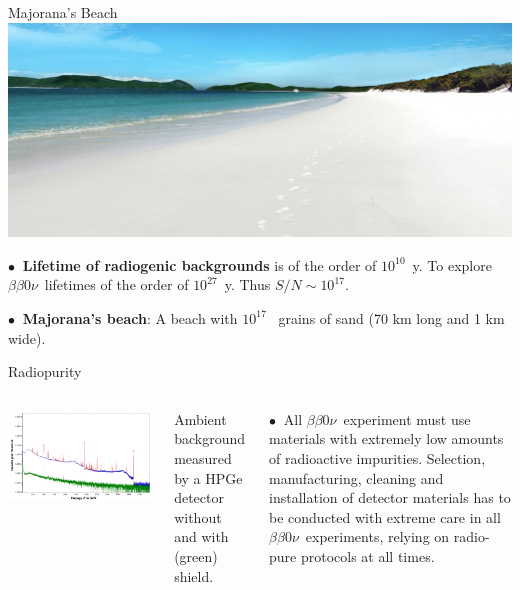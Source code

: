 \documentclass [aspectratio=169]{beamer}
\newcommand{\bbonu}{\ensuremath{\beta\beta0\nu}}
\begin{document}
\begin{frame}{Majorana's Beach}
\includegraphics[scale=0.40]{beach.png}


$\bullet~$ {\bf Lifetime of radiogenic backgrounds} is of the order of $10^{10}$~y. To explore \bbonu\ lifetimes of the order of $10^{27}$~y. Thus $S/N \sim 10^{17}$.

$\bullet~$ {\bf Majorana’s beach}: A beach with $10^{17}$~ grains of sand (70 km long and 1 km wide).

\end{frame}

\begin{frame}{Radiopurity}
\begin{columns}
\includegraphics[scale=0.22]{radiospectrum.png}

Ambient background measured by a HPGe detector without and with (green) shield.

 
$\bullet~$ All \bbonu\  experiment must use materials with extremely low amounts of radioactive impurities. Selection, manufacturing, cleaning and installation of detector materials has to be conducted with extreme care in all \bbonu\  experiments, relying on radio-pure protocols at all times.

\end{columns}
\end{frame}
\end{document}
